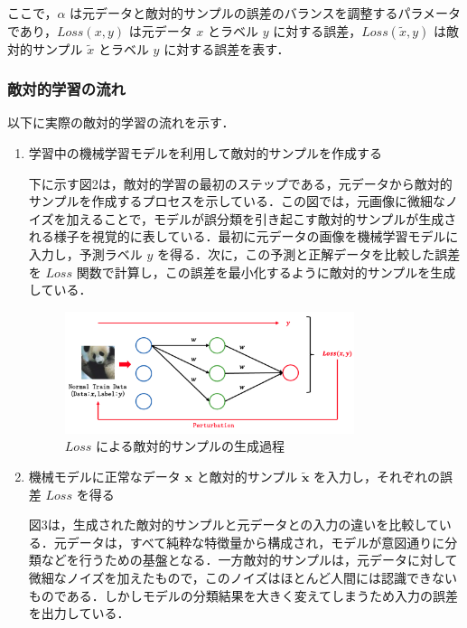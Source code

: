 
ここで，$\alpha$ は元データと敵対的サンプルの誤差のバランスを調整するパラメータであり，$Loss(x,y)$ は元データ $x$ とラベル $y$ に対する誤差，$Loss(\tilde{x},y)$ は敵対的サンプル $\tilde{x}$ とラベル $y$ に対する誤差を表す．

\subsubsection{敵対的学習の流れ}
以下に実際の敵対的学習の流れを示す．\cite{MBSD-AdversarialTraining}

\begin{enumerate}

    \item 学習中の機械学習モデルを利用して敵対的サンプルを作成する

    下に示す図2は，敵対的学習の最初のステップである，元データから敵対的サンプルを作成するプロセスを示している．この図では，元画像に微細なノイズを加えることで，モデルが誤分類を引き起こす敵対的サンプルが生成される様子を視覚的に表している．最初に元データの画像を機械学習モデルに入力し，予測ラベル $y$ を得る．次に，この予測と正解データを比較した誤差を $Loss$ 関数で計算し，この誤差を最小化するように敵対的サンプルを生成している．
    
    \begin{figure}[H]
        \centering
        \includegraphics[width=0.8\textwidth]{images/敵対的学習1.png}
        \caption{ $Loss$ による敵対的サンプルの生成過程}
        \label{fig:adversarial_learning1}
    \end{figure}
    
    \item 機械モデルに正常なデータ $\bm{x}$ と敵対的サンプル $\bm{\tilde{x}}$ を入力し，それぞれの誤差 $Loss$ を得る

    図3は，生成された敵対的サンプルと元データとの入力の違いを比較している．元データは，すべて純粋な特徴量から構成され，モデルが意図通りに分類などを行うための基盤となる．一方敵対的サンプルは，元データに対して微細なノイズを加えたもので，このノイズはほとんど人間には認識できないものである．しかしモデルの分類結果を大きく変えてしまうため入力の誤差を出力している．


\end{enumerate}
